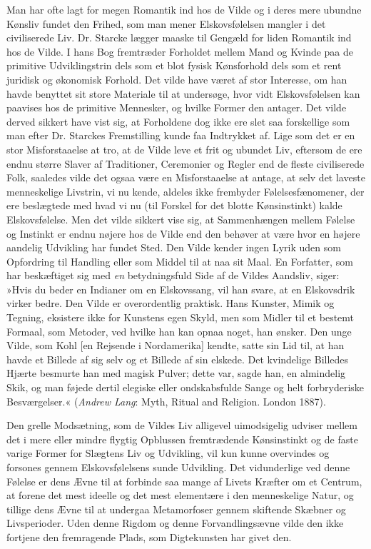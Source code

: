 \documentclass[12pt,a4paper,openany]{book}
\newcommand{\opage}[1]{\marginnote{\footnotesize\textit{[#1]}}}
\begin{document}
Man har ofte lagt for megen Romantik ind hos de Vilde
og i deres mere ubundne Kønsliv fundet den Frihed, som man
mener Elskovsfølelsen mangler i det civiliserede Liv. Dr. Starcke
lægger maaske til Gengæld for liden Romantik ind hos de Vilde.
I hans Bog fremtræder Forholdet mellem Mand og Kvinde paa
de primitive Udviklingstrin dels som et blot fysisk Kønsforhold
dels som et rent juridisk og økonomisk Forhold. Det vilde have
været af stor Interesse, om han havde benyttet sit store Materiale
til at undersøge, hvor vidt Elskovsfølelsen kan paavises hos de
primitive Mennesker, og hvilke Former den antager. Det vilde
derved sikkert have vist sig, at Forholdene dog ikke ere slet saa
forskellige som man efter Dr. Starckes Fremstilling kunde faa
Indtrykket af. Lige som det er en stor Misforstaaelse at tro, at
de Vilde leve et frit og ubundet Liv, eftersom de ere endnu større
Slaver af Traditioner, Ceremonier og Regler end de fleste civiliserede
Folk, saaledes vilde det ogsaa være en Misforstaaelse at
antage, at selv det laveste menneskelige Livstrin, vi nu kende,
aldeles ikke frembyder Følelsesfænomener, der ere beslægtede med
hvad vi nu (til Forskel for det blotte Kønsinstinkt) kalde Elskovsfølelse.
Men det vilde sikkert vise sig, at Sammenhængen mellem
Følelse og Instinkt er endnu nøjere hos de Vilde end den behøver
at være hvor en højere aandelig Udvikling har fundet Sted. Den
Vilde kender ingen Lyrik uden som Opfordring til Handling eller
som Middel til at naa sit Maal. En Forfatter, som har beskæftiget
sig med \emph{en} betydningsfuld Side af de Vildes Aandsliv, siger:
»Hvis du beder en Indianer om en Elskovssang, vil han svare,
at en Elskovsdrik virker bedre. Den Vilde er overordentlig praktisk.
Hans Kunster, Mimik og Tegning, eksistere ikke for Kunstens egen
Skyld, men som Midler til et bestemt Formaal, som Metoder, ved
hvilke han kan opnaa noget, han ønsker. Den unge Vilde, som
Kohl [en Rejsende i Nordamerika] kendte, satte sin Lid til, at
han havde et Billede af sig selv og et Billede af sin elskede. Det
kvindelige Billedes Hjærte besmurte han med magisk Pulver; dette
var, sagde han, en almindelig Skik, og man føjede dertil elegiske
eller ondskabsfulde Sange og helt forbryderiske Besværgelser.«
(\emph{Andrew Lang}: Myth, Ritual and Religion. London 1887).

Den grelle Modsætning, som de Vildes Liv alligevel uimodsigelig
udviser mellem det i mere eller mindre flygtig Opblussen
\opage{794}fremtrædende Kønsinstinkt og de faste varige Former for Slægtens
Liv og Udvikling, vil kun kunne overvindes og forsones gennem
Elskovsfølelsens sunde Udvikling. Det vidunderlige ved denne
Følelse er dens Ævne til at forbinde saa mange af Livets Kræfter
om et Centrum, at forene det mest ideelle og det mest elementære
i den menneskelige Natur, og tillige dens Ævne til at undergaa
Metamorfoser gennem skiftende Skæbner og Livsperioder. Uden
denne Rigdom og denne Forvandlingsævne vilde den ikke fortjene
den fremragende Plads, som Digtekunsten har givet den.
\end{document}
